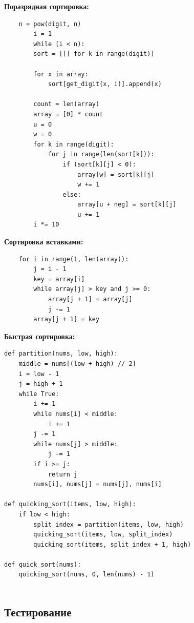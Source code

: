 \documentclass[a4paper,14pt]{article} %
\begin{document}
        \textbf{Поразрядная сортировка:}
        
	\begin{lstlisting}
	n = pow(digit, n)
    	i = 1
    	while (i < n):
		sort = [[] for k in range(digit)]

		for x in array:
			sort[get_digit(x, i)].append(x)

		count = len(array)
		array = [0] * count
		u = 0
		w = 0
		for k in range(digit):
			for j in range(len(sort[k])):
				if (sort[k][j] < 0):
					array[w] = sort[k][j]
					w += 1
				else:
					array[u + neg] = sort[k][j]
					u += 1
		i *= 10
	\end{lstlisting}

	\textbf{Сортировка вставками: }
	
	\begin{lstlisting}
	for i in range(1, len(array)):
		j = i - 1
		key = array[i]
		while array[j] > key and j >= 0:
			array[j + 1] = array[j]
			j -= 1
		array[j + 1] = key
	\end{lstlisting}

	\textbf{Быстрая сортировка: }
	
	\begin{lstlisting}
def partition(nums, low, high):
    middle = nums[(low + high) // 2]
    i = low - 1
    j = high + 1
    while True:
        i += 1
        while nums[i] < middle:
            i += 1
        j -= 1
        while nums[j] > middle:
            j -= 1
        if i >= j:
            return j
        nums[i], nums[j] = nums[j], nums[i]

def quicking_sort(items, low, high):
    if low < high:
        split_index = partition(items, low, high)
        quicking_sort(items, low, split_index)
        quicking_sort(items, split_index + 1, high)

def quick_sort(nums):
    quicking_sort(nums, 0, len(nums) - 1)
        
	\end{lstlisting}
                
	\subsection{Тестирование}
	\hfill
	
\end{document}
